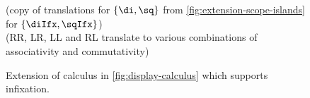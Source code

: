 \begin{figure}[hb]
\begin{mdframed}
    \vspace*{\baselineskip}%
    \begin{pfbox}
    \end{pfbox}
    \begin{pfbox}
    \end{pfbox}
    \\
    \vspace*{\baselineskip}
    \hrulefill
    \\
    \vspace*{\baselineskip}
    (copy of translations for $\{\di,\sq\}$ from
    \autoref{fig:extension-scope-islands} for $\{\diIfx,\sqIfx\}$)
    \\
    \vspace*{\baselineskip}
    ({RR\diIfx}, {LR\diIfx}, {LL\diIfx} and {RL\diIfx} translate to
    various combinations of associativity and commutativity)
    \\
    \vspace*{\baselineskip}
  \end{mdframed}
  \caption{Extension of calculus in \autoref{fig:display-calculus}
    which supports infixation.}
  \label{fig:extension-infixation}
\end{figure}
%
